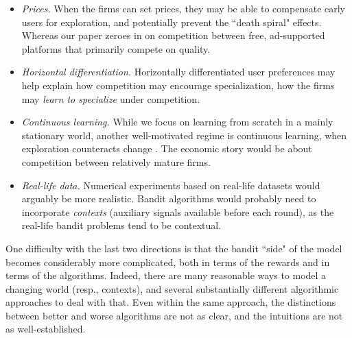 \documentclass[../competing_bandits.tex]{subfiles}
\begin{document}
\begin{itemize} 

\item \emph{Prices.} 
When the firms can set prices, they may be able to compensate early users for exploration, and potentially prevent the ``death spiral" effects. Whereas our paper zeroes in on competition between free, ad-supported platforms that primarily compete on quality.

\item \emph{Horizontal differentiation.} 
Horizontally differentiated user preferences may help explain how competition may encourage specialization, \ie how the firms may \emph{learn to specialize} under competition.


\item \emph{Continuous learning.}
While we focus on learning from scratch in a mainly stationary world, another well-motivated regime is continuous learning, when exploration counteracts change
\citep{DynamicMAB-colt08}.
The economic story would be about competition between relatively mature firms. 

\item \emph{Real-life data.}
Numerical experiments based on real-life datasets would arguably be more realistic. Bandit algorithms would probably need to incorporate \emph{contexts} (auxiliary signals available before each round), as the real-life bandit problems tend to be contextual.

\end{itemize}

\noindent One difficulty with the last two directions is that the bandit ``side" of the model becomes considerably more complicated, both in terms of the rewards and in terms of the algorithms. Indeed, there are many reasonable ways to model a changing world (resp., contexts), and several  substantially different algorithmic approaches to deal with that. Even within the same approach, the distinctions between better and worse algorithms are not as clear, and the intuitions are not as well-established. 
\end{document}
